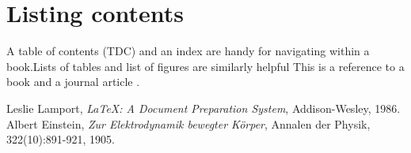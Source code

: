 \documentclass{article}
\begin{document}
	\section{Listing contents}
	A table of contents (TDC)  and an index are handy for
	navigating
	within a book.Lists of tables and list of figures are similarly helpful
	This is a reference to a book \cite{latexcomp} and a journal article \cite{einstein}.
	\begin{thebibliography}{9}
		Leslie Lamport,
		\textit{LaTeX: A Document Preparation System},
		Addison-Wesley, 1986.
		Albert Einstein,
		\textit{Zur Elektrodynamik bewegter Körper},
		Annalen der Physik, 322(10):891-921, 1905.
	\end{thebibliography}
\end{document}
